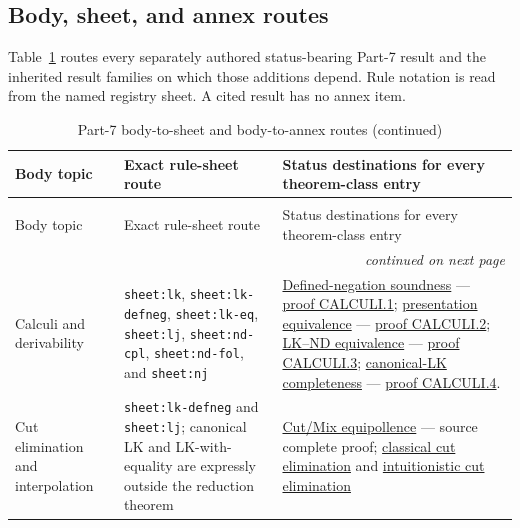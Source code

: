 \begingroup
\pagestyle{plain}
\begin{landscape}
\thispagestyle{plain}
\section{Body, sheet, and annex routes}
\label{sec:p07-navigation}

Table~\ref{tab:p07-body-annex-routes} routes every separately authored
status-bearing Part-7 result and the inherited result families on which those
additions depend.  Rule notation is read from the named registry sheet.  A
cited result has no annex item.

\begingroup\scriptsize
\setlength{\tabcolsep}{3pt}
\begin{longtable}{@{}p{.82in}p{2.05in}p{4.95in}@{}}
\caption{Part-7 body-to-sheet and body-to-annex routes.}
\label{tab:p07-body-annex-routes}\\
\toprule
Body topic & Exact rule-sheet route & Status destinations for every theorem-class entry \\
\midrule
\endfirsthead
\caption[]{Part-7 body-to-sheet and body-to-annex routes (continued)}\\
\toprule
Body topic & Exact rule-sheet route & Status destinations for every theorem-class entry \\
\midrule
\endhead
\midrule\multicolumn{3}{r}{\emph{continued on next page}}\\
\endfoot
\endlastfoot
Calculi and derivability &
\texttt{sheet:lk}, \texttt{sheet:lk-defneg}, \texttt{sheet:lk-eq},
\texttt{sheet:lj}, \texttt{sheet:nd-cpl}, \texttt{sheet:nd-fol}, and
\texttt{sheet:nj} &
\hyperref[thm:p07-lkd-soundness]{Defined-negation soundness}
--- \hyperref[annex:p7.calculi.1]{proof CALCULI.1};
\hyperref[thm:p07-lk-presentation-equivalence]{presentation equivalence}
--- \hyperref[annex:p7.calculi.2]{proof CALCULI.2};
\hyperref[thm:p07-lk-nd-equivalence]{LK--ND equivalence}
--- \hyperref[annex:p7.calculi.3]{proof CALCULI.3};
\hyperref[thm:p07-canonical-lk-completeness]{canonical-LK completeness}
--- \hyperref[annex:p7.calculi.4]{proof CALCULI.4}. \\
\addlinespace
Cut elimination and interpolation &
\texttt{sheet:lk-defneg} and \texttt{sheet:lj}; canonical LK and
LK-with-equality are expressly outside the reduction theorem &
\hyperref[lem:cut-mix-equipollence]{Cut/Mix equipollence}
--- source complete proof;
\hyperref[thm:p07-classical-cut-elimination]{classical cut elimination} and
\hyperref[thm:p07-lj-exact-cut-elimination]{intuitionistic cut elimination}

\end{longtable}
\end{landscape}
